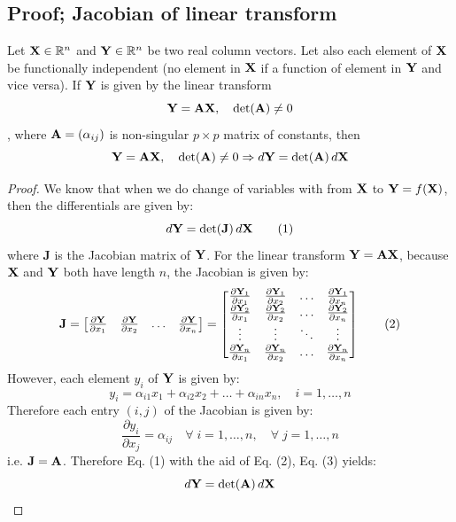 \documentclass[a4paper]{article}
\begin{document}
\subsection{Proof; Jacobian of linear transform}
\label{app:jacob_of_lin_transform}

\begin{lemma}
Let $\textbf{X}\in\mathbb{R}^n$ and $\textbf{Y}\in\mathbb{R}^n$ be two real column vectors. Let also each element of $\textbf{X}$ be functionally independent (no element in $\textbf{X}$ if a function of element in $\textbf{Y}$ and vice versa). If $\textbf{Y}$ is given by the linear transform
	\[
		\textbf{Y} = \textbf{A}\textbf{X},\quad \det(\textbf{A}) \neq 0
	\]
, where $\textbf{A} = (\alpha_{ij})$ is non-singular $p\times p$ matrix of constants, then
\begin{equation}
	\textbf{Y} = \textbf{A}\textbf{X}, \quad \det(\textbf{A}) \neq 0 \Rightarrow d\textbf{Y} = \det(\textbf{A}) \, d\textbf{X}
\end{equation}
\end{lemma}
\begin{proof}
	We know that when we do change of variables with from $\textbf{X}$ to $\textbf{Y}=f(\textbf{X})$, then the differentials are given by:
	\begin{equation*}
		d\textbf{Y} = \det(\textbf{J})\, d\textbf{X} \tag{1}	
	\end{equation*}
	where $\textbf{J}$ is the Jacobian matrix of $\textbf{Y}$. For the linear transform $\textbf{Y}  = \textbf{A}\textbf{X}$, because $\textbf{X}$ and $\textbf{Y}$ both have length $n$, the Jacobian is given by:
	\begin{equation*}
		\textbf{J} = 	
		\begin{bmatrix}
			\frac{\partial\textbf{Y}}{\partial x_1} & \frac{\partial\textbf{Y}}{\partial x_2} & \ldots & \frac{\partial\textbf{Y}}{\partial x_n} 
		\end{bmatrix} = 
		\begin{bmatrix}
			\frac{\partial\textbf{Y}_1}{\partial x_1} & \frac{\partial\textbf{Y}_1}{\partial x_2} & \ldots & \frac{\partial \textbf{Y}_1}{\partial x_n}	\\
			\frac{\partial\textbf{Y}_2}{\partial x_1} & \frac{\partial\textbf{Y}_2}{\partial x_2} & \ldots & \frac{\partial \textbf{Y}_2}{\partial x_n}	\\
			\vdots & \vdots & \ddots & \vdots \\
			\frac{\partial\textbf{Y}_n}{\partial x_1} & \frac{\partial\textbf{Y}_n}{\partial x_2} & \ldots & \frac{\partial \textbf{Y}_n}{\partial x_n}	
		\end{bmatrix}
		\tag{2}
	\end{equation*}
	However, each element $y_i$ of $\textbf{Y}$ is given by:
	\[
		y_i = \alpha_{i1}x_1 + \alpha_{i2}x_2 + \ldots + \alpha_{in}x_n, \quad i = 1,\ldots,n
	\]
	Therefore each entry $(i,j)$ of the Jacobian is given by:
	\[
		\frac{\partial y_{i}}{\partial x_j} = \alpha_{ij} \quad \forall \; i = 1,\ldots,n, \quad \forall \; j = 1,\ldots,n
		\tag{3}
	\]
	i.e. $\textbf{J}=\textbf{A}$. Therefore Eq. (1) with the aid of Eq. (2), Eq. (3) yields:
	\[
		d\textbf{Y} = \det(\textbf{A})\,d\textbf{X}	
	\]
\end{proof}
\end{document}
